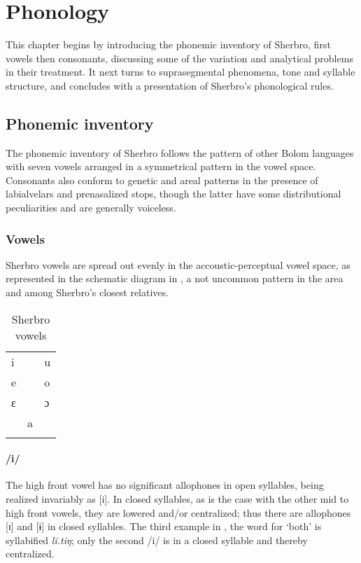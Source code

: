  \chapter{Phonology}\label{ch:2}
\hypertarget{Toc115517752}{}
This chapter begins by introducing the phonemic inventory of Sherbro, first vowels then consonants, discussing some of the variation and analytical problems in their treatment. It next turns to suprasegmental phenomena, tone and syllable structure, and concludes with a presentation of Sherbro's phonological rules.

\section{Phonemic inventory}
\label{sec.2.1}\hypertarget{Toc115517753}{}
The phonemic inventory of Sherbro follows the pattern of other Bolom languages with seven vowels arranged in a symmetrical pattern in the vowel space. Consonants also conform to genetic and areal patterns in the presence of labialvelars and prenasalized stops, though the latter have some distributional peculiarities and are generally voiceless.

\subsection{Vowels}
\label{sec:2.1.1}\hypertarget{Toc115517754}{}
Sherbro vowels are spread out evenly in the accoustic-perceptual vowel space, as represented in the schematic diagram in , a not uncommon pattern in the area and among Sherbro's closest relatives.

\begin{table}
\caption{\label{tab:phon:5}Sherbro vowels}

\begin{tabular}{lll}
\lsptoprule
 i &  & u\\
 e &  & o\\
 ɛ &  & ɔ\\
& a & \\
\lspbottomrule
\end{tabular}
\end{table}

\subsubsection{/i/}
\label{sec:2.1.1.1}
The high front vowel has no significant allophones in open syllables, being realized invariably as [i]. In closed syllables, as is the case with the other mid to high front vowels, they are lowered and/or centralized; thus there are allophones [ɪ] and [ɨ] in closed syllables. The third example in , the word for ‘both' is syllabified \textit{li.tiŋ}; only the second /i/ is in a closed syllable and thereby centralized.

